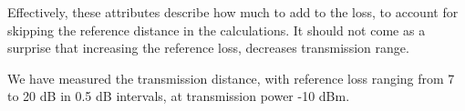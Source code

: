 \documentclass[11pt,journal]{article}
\begin{document}
	Effectively, these attributes describe how much to add to the loss, to account for skipping the reference distance in the calculations. It should not come as a surprise that increasing the reference loss, decreases transmission range. 
	
	We have measured the transmission distance, with reference loss ranging from 7 to 20 dB in 0.5 dB intervals, at transmission power -10 dBm.
	
	
	

	
\end{document}
